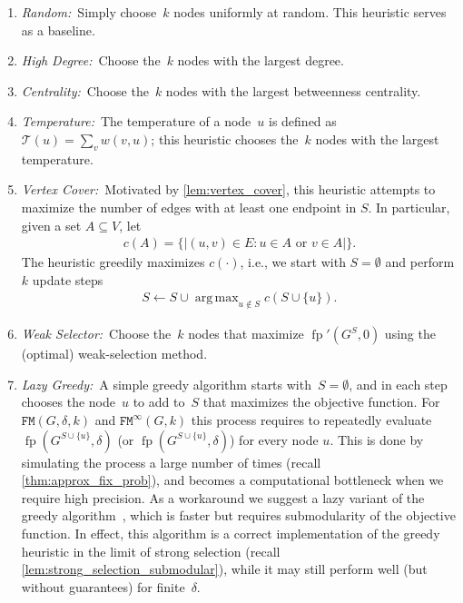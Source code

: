 \documentclass[letterpaper]{article}
\def\dfp{\fp'(G^S,0)}
\DeclareMathOperator*{\argmax}{arg\,max}
\newcommand{\fp}{\operatorname{fp}}
\newcommand{\Temp}{\mathcal{T}}
\newcommand{\NodeActivationMoran}{\texttt{FM}}
\newcommand{\NodeActivationMoranStrong}{\texttt{FM}^{\infty}}
\newcommand{\FitAdv}{\delta}
\newcommand{\Weight}{w}
\begin{document}
\begin{enumerate}
\item \emph{Random:}~Simply choose~$k$ nodes uniformly at random. This heuristic serves as a baseline.
\item \emph{High Degree:}~Choose the~$k$ nodes with the largest degree.
\item \emph{Centrality:}~Choose the~$k$ nodes with the largest betweenness centrality.
\item \emph{Temperature:}~The temperature of a node~$u$ is defined as $\Temp(u)=\sum_{v} \Weight(v,u)$; this heuristic chooses the~$k$ nodes with the largest temperature.
\item \emph{Vertex Cover:}~Motivated by \cref{lem:vertex_cover}, this heuristic attempts to maximize the number of edges with at least one endpoint in $S$.
In particular, given a set $A\subseteq V$, let 
\begin{align}
c(A)=\{ |(u,v)\in E\colon u\in A\text{ or }v\in A|  \}.
\end{align}
The heuristic greedily maximizes $c(\cdot)$, i.e.,
we start with $S=\emptyset$ and perform $k$ update steps
\begin{align}
S\gets S\cup  \argmax_{u\not \in S} c(S\cup\{u\}).
\end{align}
\item \emph{Weak Selector:}~Choose the~$k$ nodes that maximize $\dfp$ using the (optimal) weak-selection method.
\item \emph{Lazy Greedy:}~A simple greedy algorithm starts with~$S=\emptyset$, and in each step chooses the node~$u$ to add to~$S$ that maximizes the objective function.
For $\NodeActivationMoran(G,\FitAdv,k)$ and $\NodeActivationMoranStrong(G,k)$ this process requires to repeatedly evaluate $\fp(G^{S\cup\{u\}},\FitAdv)$ (or $\fp(G^{S\cup\{u\}},\FitAdv)$) for every node $u$.
This is done by simulating the process a large number of times (recall \cref{thm:approx_fix_prob}), and becomes a computational bottleneck when we require high precision. As a workaround we suggest a lazy variant of the greedy algorithm~\cite{Minoux1978}, which is faster but requires submodularity of the objective function. In effect, this algorithm is a correct implementation of the greedy heuristic in the limit of strong selection (recall \cref{lem:strong_selection_submodular}), while it may still perform well (but without guarantees) for finite~$\FitAdv$.
\end{enumerate}
\end{document}
